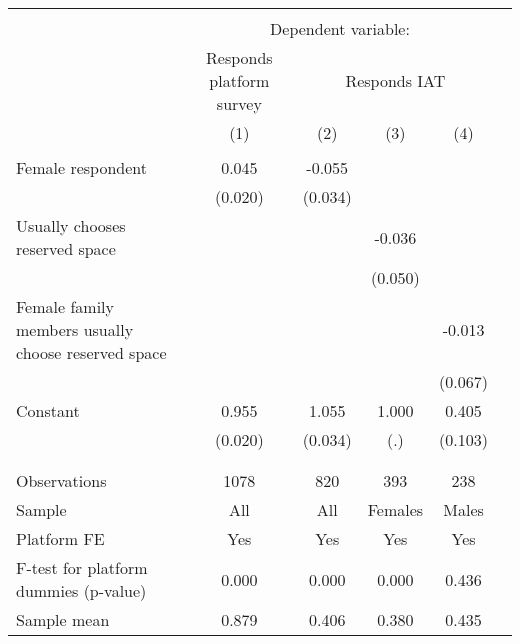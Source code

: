 \begin{tabular}{l*{5}{c}} \hline\hline \\[-1.8ex] & \multicolumn{4}{c}{Dependent variable:} \\ & \multicolumn{1}{c}{Responds platform survey} & \multicolumn{3}{c}{Responds IAT} \\ \cmidrule(lr){2-2}\cmidrule(lr){3-5}
                    &\multicolumn{1}{c}{(1)}         &\multicolumn{1}{c}{(2)}         &\multicolumn{1}{c}{(3)}         &\multicolumn{1}{c}{(4)}         \\
\hline \\[-1.8ex]
Female respondent   &       0.045\sym{**} &      -0.055         &                     &                     \\
                    &     (0.020)         &     (0.034)         &                     &                     \\
[1em]
Usually chooses reserved space&                     &                     &      -0.036         &                     \\
                    &                     &                     &     (0.050)         &                     \\
[1em]
Female family members usually choose reserved space&                     &                     &                     &      -0.013         \\
                    &                     &                     &                     &     (0.067)         \\
[1em]
Constant            &       0.955\sym{***}&       1.055\sym{***}&       1.000         &       0.405\sym{***}\\
                    &     (0.020)         &     (0.034)         &         (.)         &     (0.103)         \\
\\[-1.8ex] \hline \\[-1.8ex]
Observations        &        1078         &         820         &         393         &         238         \\
Sample              &         All         &         All         &     Females         &       Males         \\
Platform FE         &         Yes         &         Yes         &         Yes         &         Yes         \\
F-test for platform dummies (p-value)&       0.000         &       0.000         &       0.000         &       0.436         \\
Sample mean         &       0.879         &       0.406         &       0.380         &       0.435         \\
\hline\hline \end{tabular}

